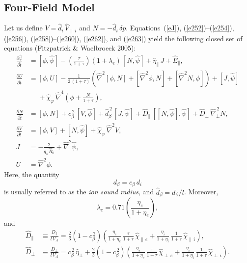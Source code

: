 \documentclass[notitlepage,12pt]{article}
\begin{document}
\subsection{Four-Field Model}\label{fourf}
Let us define $V=\hat{d}_i\,\hat{V}_{\parallel\,i}$ and $N=-\hat{d}_i\,\delta p$. Equations~(\ref{eJ}), (\ref{e252})--(\ref{e254}), (\ref{e256}), (\ref{e258})--(\ref{e260}), (\ref{e262}), and (\ref{e263}) yield the following closed set of equations (Fitzpatrick \& Waelbroeck 2005):
\begin{align}\label{e264}
\frac{\partial\hat{\psi}}{\partial\hat{t}}&= [\phi,\hat{\psi}] -\left(\frac{\tau}{1+\tau}\right)(1+\lambda_e)\,[N,\hat{\psi}]
+\hat{\eta}_\parallel\,J + \hat{E}_\parallel,\\[0.5ex]
\frac{\partial U}{\partial \hat{t}}&= [\phi,U] - \frac{1}{2\,(1+\tau)}\left(\hat{\nabla}^2[\phi,N] + [\hat{\nabla}^2\phi,N] + [\hat{\nabla}^2 N,\phi]\right) + [J,\hat{\psi}] \nonumber\\[0.5ex]&\phantom{=}+\hat{\chi}_\varphi  \,\hat{\nabla}^4\!\left(\phi + \frac{N}{1+\tau}\right),\label{e265} \\[0.5ex]
\frac{\partial N}{\partial \hat{t}}&= [\phi,N] +c_\beta^{\,2}\,[V,\hat{\psi}] +\hat{d}_\beta^{\,2}\,[J,\hat{\psi}] + \hat{D}_\parallel\,[[N,\hat{\psi}],\hat{\psi}]
+ \hat{D}_\perp\,\hat{\nabla}_\perp^{\,2}N,\label{e266}\\[0.5ex]
\frac{\partial V}{\partial\hat{t}}&= [\phi,V] +[N,\hat{\psi}] + \hat{\chi}_\varphi\,\hat{\nabla}^2 V,\label{e267}\\[0.5ex]
J &=-\frac{2}{q_s\,\hat{R}_0}+\hat{\nabla}^2\hat{\psi},\\[0.5ex]
U &=\hat{\nabla}^2 \phi.\label{e269}
\end{align}
Here, the quantity 
\begin{equation}\label{e270}
d_\beta = c_\beta\,d_i 
\end{equation}
 is usually referred to as the {\em ion sound radius}, and $\hat{d}_\beta =d_\beta/l$. 
Moreover,
\begin{equation}
 \lambda_e = 0.71\left(\frac{\eta_e}{1+\eta_e}\right),
\end{equation}
and
\begin{align}
\hat{D}_\parallel&\equiv\frac{D_{\parallel}}{l\,V_A}= \frac{2}{3}\left(1-c_\beta^{\,2}\right)\!\left(\frac{\eta_e}{1+\eta_e}\,\frac{\tau}{1+\tau}\,\hat{\chi}_{\parallel\,e} + \frac{\eta_i}{1+\eta_i}\,\frac{1}{1+\tau}\,\hat{\chi}_{\parallel\,i}\right),\\[0.5ex]
\hat{D}_\perp &\equiv \frac{D_{\perp}}{l\,V_A}= c_\beta^{\,2}\,\hat{\eta}_\perp +  \frac{2}{3}\left(1-c_\beta^{\,2}\right)\!\left(\frac{\eta_e}{1+\eta_e}\,\frac{\tau}{1+\tau}\,\hat{\chi}_{\perp\,e} + \frac{\eta_i}{1+\eta_i}\,\frac{1}{1+\tau}\,\hat{\chi}_{\perp\,i}\right).
\end{align}
\end{document}

